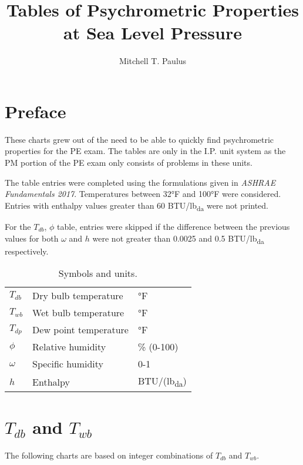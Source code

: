 \documentclass{book}
\title{Tables of Psychrometric Properties at Sea Level Pressure}
\author{Mitchell T. Paulus}
\newcommand{\tdb}{\(T_{db}\)}
\newcommand{\twb}{\(T_{wb}\)}
\newcommand{\tdp}{\(T_{dp}\)}
\newcommand{\rh}{\(\phi\)}
\newcommand{\spechum}{\(\omega\)}
\newcommand{\enthalpy}{\(h\)}
\begin{document}
\maketitle{}

\tableofcontents{}

\chapter{Preface}

These charts grew out of the need to be able to quickly find
psychrometric properties for the PE exam. The tables are only in the
I.P. unit system as the PM portion of the PE exam only consists of
problems in these units.

The table entries were completed using the formulations given in
\textit{ASHRAE Fundamentals 2017}. Temperatures between 32°F and 100°F
were considered. Entries with enthalpy values greater than 60
BTU/lb\textsubscript{da}
were not printed.

For the \tdb{}, \rh{} table, entries were skipped if the difference
between the previous values for both \spechum{} and \enthalpy{} were not
greater than 0.0025 and 0.5 BTU/lb\textsubscript{da} respectively.

\begin{table}
\centering
\caption{Symbols and units.}
\label{tab:}
\begin{tabular}{lll}
\toprule
    \tdb & Dry bulb temperature & °F \\
    \twb & Wet bulb temperature & °F \\
    \tdp & Dew point temperature & °F \\
    \rh & Relative humidity & \% (0-100) \\
    \spechum & Specific humidity & 0-1 \\
    \enthalpy & Enthalpy & BTU/(lb\textsubscript{da}) \\
\end{tabular}

\end{table}


\chapter{\(T_{db}\) and \(T_{wb}\) }

The following charts are based on integer combinations of \(T_{db}\) and
\(T_{wb}\).

\newpage
{
\small



}
\end{document}
